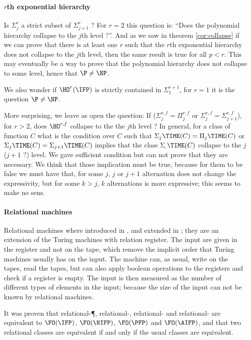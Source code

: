 \documentclass[a4paper,12pt]{article}
\theoremstyle{definition}
\newcommand{\ATIME}[2]{\ensuremath{\Sigma_{#2}\TIME(#1)}}
\newcommand{\coATIME}[2]{\ensuremath{\Pi_{#2}\TIME(#1)}}
\newcommand{\hoa}[1]{\ensuremath{\HO^{#1}}}
\newcommand{\hob}[2]{\ensuremath{\Sigma^{#1}_{#2}}}
\newcommand{\hod}[2]{\ensuremath{\HO^{#1,#2}}}
\newcommand{\hoc}[3]{\ensuremath{\Sigma^{#1,#3}_{#2}}}
\newcommand{\cohoc}[3]{\ensuremath{\Pi^{#1,#3}_{#2}}}
\newcommand{\eh}[1]{$#1$th exponential hierarchy}
\begin{document}
\paragraph{\eh r}Is $\hob{r}{j}$ a strict subset of $\hob{r}{j+1}$ ?
For $r=2$ this question is: ``Does the polynomial hierarchy collapse
to the $j$th level ?''. And as we saw in theorem \ref{cor:collapse} if
we can prove that there is at least one $r$ such that the \eh r does
not collapse to the $j$th level, then the same result is true for all
$p<r$. This may eventually be a way to prove that the polynomial
hierarchy does not collapse to some level, hence that $\P\ne\NP$.

We also wonder if $\hoa{r}(\IFP)$ is strictly contained in
$\hob{r+1}{1}$, for $r=1$ it is the question $\P\ne\NP$.

More surprising, we leave as open the question: If ($\hoc rjf=\cohoc
rjf$ or $\hoc rjf=\hoc r{j+1}f$), for $r>2$, does \hod rf collapse to
the the $j$th level ? In general, for a class of function $C$ what is
the condition over $C$ such that $\ATIME{C}{j}=\coATIME{C}{j}$ or
$\ATIME{C}{j}=\ATIME{C}{j+1}$ implies that the class $\ATIME{C}{.}$
collapse to the $j$($j+1$ ?) level. We gave sufficient condition but
can not prove that they are necessary. We think that those implication
must be true, because for them to be false we must have that, for some
$j$, $j$ or $j+1$ alternation does not change the expressivity, but 
for some $k>j$, $k$ alternations is more expressive; this seems to make
no sens.

\paragraph{Relational machines}

Relational machines where introduced in \cite{AbVi}, and extended in
\cite{nfp}; they are an extension of the Turing machines with relation
register. The input are given in the register and not on the tape,
which remove the implicit order that Turing machines usually has on
the input. The machine can, as usual, write on the tapes, read the
tapes, but can also apply boolean operations to the registers and
check if a register is empty. The input is then measured as the number
of different types of elements in the input; because the size of the
input can not be known by relational machines.

It was proven that relational-\P, relational-\NP{}, relational-\PSPACE{}
and relational-\EXP{} are equivalent to $\FO(\IFP)$, $\FO(\NIFP)$,
$\FO(\PFP)$ and $\FO(\AIFP)$, and that two relational classes are
equivalent if and only if the usual classes are equivalent.
\end{document}
